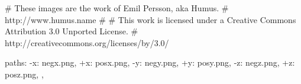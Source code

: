 {

	# These images are the work of Emil Persson, aka Humus.
	# http://www.humus.name
	#
	# This work is licensed under a Creative Commons Attribution 3.0 Unported License.
	# http://creativecommons.org/licenses/by/3.0/

	paths: {
		-x: negx.png,
		+x: posx.png,
		-y: negy.png,
		+y: posy.png,
		-z: negz.png,
		+z: posz.png,
	},
}